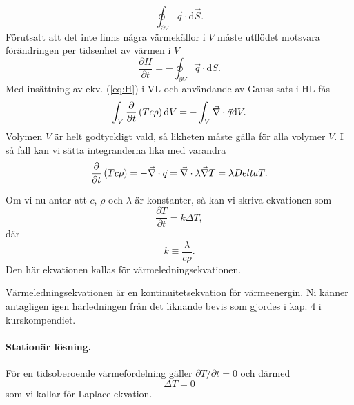 \documentclass[%
oneside,                 %
final,                   %
10pt]{article}
\newenvironment{warning_mdfboxadmon}[1][]{
\begin{warning_mdfboxmdframed}[frametitle=#1]
}
{
\end{warning_mdfboxmdframed}
}
\begin{document}
\noindent
\begin{equation}
  \oint_{\partial  V} \vec{q}\cdot \mbox{d}\vec{S}.
\end{equation}
Förutsatt att det inte finns några värmekällor i $V$  måste 
utflödet motsvara förändringen per tidsenhet av värmen
i $V$
\begin{equation}
  \frac{\partial H}{\partial t} = - \oint_{\partial  V} {\vec{q}\cdot \mbox{d}S}.
\end{equation}
Med insättning av ekv. (\ref{eq:H}) i VL och användande av Gauss sats i HL fås
\begin{equation}
  \int_{V}
\frac{\partial}{\partial t} \left( Tc\rho \right) \mbox{d}V = -\int_{V} \vec{\nabla} \cdot \vec{q}\mbox{d}V.
\label{energi}
\end{equation}
Volymen $V$ är helt godtyckligt vald, så likheten måste gälla för alla volymer $V$. I så fall kan vi sätta integranderna lika med varandra
\begin{equation}
  \frac{\partial}{\partial t}\left(T c\rho\right) = - \vec{\nabla} \cdot \vec{q}
= \vec{\nabla} \cdot \lambda \vec{\nabla} T = \lambda \\Delta T.
\end{equation}

Om vi nu antar att $c$, $\rho$ och $\lambda$  är konstanter, så kan vi skriva ekvationen som
\begin{equation}
  \frac{\partial T}{\partial t} = k \Delta  T,
\end{equation}
där 
\begin{equation}
  k \equiv \frac{\lambda}{c\rho}.
\end{equation}
Den här ekvationen kallas för värmeledningsekvationen. 


\begin{warning_mdfboxadmon}[Kommentar]
Värmeledningsekvationen är en kontinuitetsekvation för värmeenergin. Ni känner antagligen igen härledningen från det liknande bevis som gjordes i kap. 4 i kurskompendiet.
\end{warning_mdfboxadmon} %



\paragraph{Stationär lösning.}
För en tidsoberoende värmefördelning gäller $\partial T / \partial t = 0$ och därmed
\begin{equation}
  \Delta  T = 0
\end{equation}
som vi kallar för Laplace-ekvation.
\end{document}
